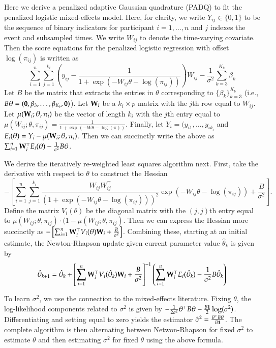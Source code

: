 \documentclass[12pt]{amsart}
\def\W{{\bf W}}
\begin{document}
Here we derive a penalized adaptive Gaussian quadrature (PADQ) to fit the   penalized logistic mixed-effects model.  Here, for clarity, we write $Y_{ij} \in \{ 0, 1 \}$ to be the sequence of binary indicators for participant $i = 1,\ldots,n$ and $j$ indexes the event and subsampled times.  We write $W_{ij}$ to denote the time-varying covariate.  Then the score equations for the penalized logistic regression with offset $\log(\pi_{ij})$ is written as
$$
\sum_{i=1}^n \sum_{j=1}^{k_i} \left( y_{ij} - \frac{1}{1+\exp (- W_{ij} \theta - \log (\pi_{ij}) )} \right) W_{ij} - \frac{1}{\sigma^2} \sum_{k=3}^{K_b} \beta_k
$$
Let $B$ be the matrix that extracts the entries in $\theta$ corresponding to $\{ \beta_k\}_{k=3}^{K_b}$ (i.e., $B \theta = ({\bf 0}, \beta_3, \ldots, \beta_{K_b},{\bf 0})$).  Let $\W_i$ be a $k_i \times p$ matrix with the $j$th row equal to $W_{ij}$. Let $\mu(\W_i; \theta, \pi_i)$ be the vector of length $k_i$ with the $j$th entry equal to $\mu(W_{ij}; \theta, \pi_{ij}) = \frac{1}{1+\exp(-W \theta - \log(\pi))}$.  Finally, let $Y_i = (y_{i1},\ldots, y_{i k_i}$ and $E_i (\theta) = Y_i - \mu(\W_i; \theta, \pi_i)$. Then we can succinctly write the above as $\sum_{i=1}^n \W_i^\top E_i (\theta)- \frac{1}{\sigma^2} B \theta$.

We derive the iteratively re-weighted least squares algorithm next. First, take the derivative with respect to $\theta$ to construct the Hessian
$$
- \left[ \sum_{i=1}^n \sum_{j=1}^{k_i} \frac{W_{ij} W_{ij}^\top}{(1+\exp (- W_{ij} \theta - \log (\pi_{ij}) ))^2} \exp(-W_{ij} \theta - \log (\pi_{ij})) + \frac{B}{\sigma^2} \right].
$$
Define the matrix $V_i (\theta)$ be the diagonal matrix with the $(j,j)$th entry equal to $\mu(W_{ij}; \theta, \pi_{ij}) \cdot (1-\mu(W_{ij}; \theta, \pi_{ij})$. Then we can express the Hessian more succinctly as $- \left[ \sum_{i=1}^n \W_i^\top V_i (\theta) \W_i + \frac{B}{\sigma^2} \right]$.  Combining these, starting at an initial estimate, the Newton-Rhapson update given current parameter value $\hat \theta_k$ is given by
$$
\hat \theta_{k+1} = \hat \theta_{k} + \left[ \sum_{i=1}^n \W_i^\top V_i (\hat \theta_k) \W_i + \frac{B}{\sigma^2} \right]^{-1} \left(\sum_{i=1}^n \W_i^\top E_i (\hat \theta_k) - \frac{1}{\sigma^2} B \hat \theta_k \right)
$$

To learn $\sigma^2$, we use the connection to the mixed-effects literature.
Fixing $\theta$, the log-likelihood components related to $\sigma^2$ is given by $-\frac{1}{2\sigma^2} \theta^\top B \theta - \frac{B {\bf 1}}{2} \log (\sigma^2)$.  Differentiating and setting equal to zero yields the estimator
$\hat \sigma^2 = \frac{\theta^\top B \theta}{B {\bf 1}}$.  The complete algorithm is then alternating between Netwon-Rhapson for fixed $\sigma^2$ to estimate $\theta$ and then estimating $\sigma^2$ for fixed $\theta$ using the above formula.
\end{document}
